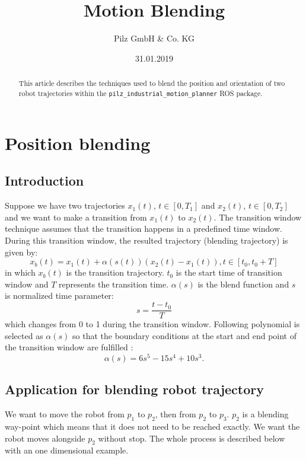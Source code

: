 \documentclass{article}
\begin{document}
\title{Motion Blending}
\author{Pilz GmbH \& Co. KG}
\date{31.01.2019}

\maketitle

\begin{abstract}
\noindent This article describes the techniques used to blend the position and orientation of two robot trajectories within the {\tt pilz\_industrial\_motion\_planner}\cite{pilztrajectorygeneration} ROS package.
\end{abstract}


\newpage

\section{Position blending}

\subsection{Introduction}

Suppose we have two trajectories $x_1(t)$, $t\in[0,T_1]$ and $x_2(t)$, $t\in[0,T_2]$ and we want to make a transition from $x_1(t)$ to $x_2(t)$. The transition window technique assumes that the transition happens in a predefined time window. During this transition window, the resulted trajectory (blending trajectory) is given by:
\begin{equation}
	x_b(t) = x_1(t) + \alpha(s(t))(x_2(t)-x_1(t)), t \in [t_0, t_0 + T]
\end{equation}
in which $x_b(t)$ is the transition trajectory. $t_0$ is the start time of transition window and $T$ represents the transition time. $\alpha(s)$ is the blend function and $s$ is normalized time parameter:
\begin{equation}
s = \frac{t - t_0}{T}
\label{eq:1}
\end{equation}
which changes from 0 to 1 during the transition window. Following polynomial is selected as $\alpha(s)$ so that the boundary conditions at the start and end point of the transition window are fulfilled \cite{lloyd1993trajectory}:
\begin{equation}
\alpha(s) = 6s^5 - 15s^4 + 10s^3.
\label{eq:2}
\end{equation}

\subsection{Application for blending robot trajectory}
We want to move the robot from $p_1$ to $p_2$, then from $p_2$ to $p_3$. $p_2$ is a blending way-point which means that it does not need to be reached exactly. We want the robot moves alongside $p_2$ without stop. The whole process is described below with an one dimensional example.
\end{document}
